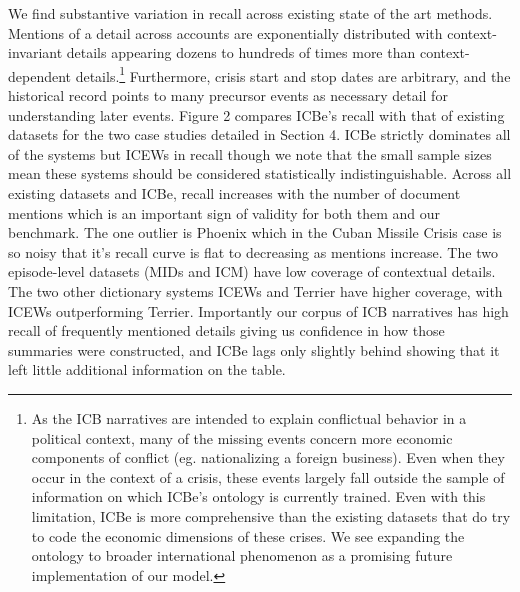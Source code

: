 \documentclass{article}
\begin{document}
We find substantive variation in recall across existing state of the art
methods. Mentions of a detail across accounts are exponentially
distributed with context-invariant details appearing dozens to hundreds
of times more than context-dependent details.\footnote{As the ICB
  narratives are intended to explain conflictual behavior in a political
  context, many of the missing events concern more economic components
  of conflict (eg. nationalizing a foreign business). Even when they
  occur in the context of a crisis, these events largely fall outside
  the sample of information on which ICBe's ontology is currently
  trained. Even with this limitation, ICBe is more comprehensive than
  the existing datasets that do try to code the economic dimensions of
  these crises. We see expanding the ontology to broader international
  phenomenon as a promising future implementation of our model.}
Furthermore, crisis start and stop dates are arbitrary, and the
historical record points to many precursor events as necessary detail
for understanding later events. Figure 2 compares ICBe's recall with
that of existing datasets for the two case studies detailed in Section
4. ICBe strictly dominates all of the systems but ICEWs in recall though
we note that the small sample sizes mean these systems should be
considered statistically indistinguishable. Across all existing datasets
and ICBe, recall increases with the number of document mentions which is
an important sign of validity for both them and our benchmark. The one
outlier is Phoenix which in the Cuban Missile Crisis case is so noisy
that it's recall curve is flat to decreasing as mentions increase. The
two episode-level datasets (MIDs and ICM) have low coverage of
contextual details. The two other dictionary systems ICEWs and Terrier
have higher coverage, with ICEWs outperforming Terrier. Importantly our
corpus of ICB narratives has high recall of frequently mentioned details
giving us confidence in how those summaries were constructed, and ICBe
lags only slightly behind showing that it left little additional
information on the table.
\end{document}
